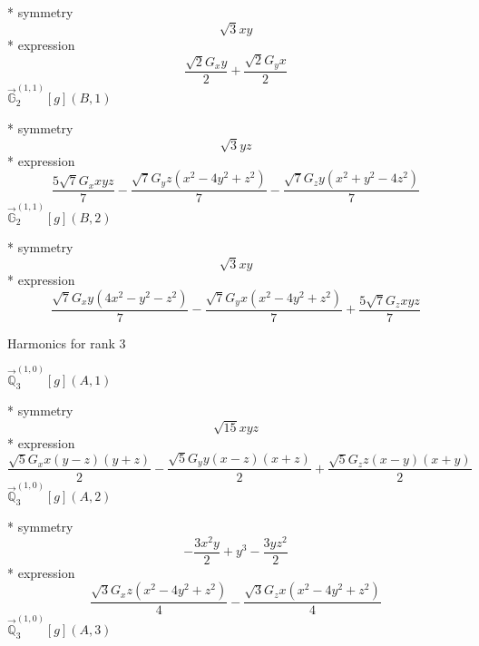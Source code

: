 \documentclass[fleqn,8pt]{jsarticle}
\begin{document}
\noindent\quad ** symmetry
\begin{dmath*}
\sqrt{3} x y
\end{dmath*}
\noindent\quad ** expression
\begin{dmath*}
\frac{\sqrt{2} G_{x} y}{2} + \frac{\sqrt{2} G_{y} x}{2}
\end{dmath*}
\noindent\quad $\vec{\mathbb{G}}_{2}^{(1,1)}[g](B,1)$

\noindent\quad ** symmetry
\begin{dmath*}
\sqrt{3} y z
\end{dmath*}
\noindent\quad ** expression
\begin{dmath*}
\frac{5 \sqrt{7} G_{x} x y z}{7} - \frac{\sqrt{7} G_{y} z \left(x^{2} - 4 y^{2} + z^{2}\right)}{7} - \frac{\sqrt{7} G_{z} y \left(x^{2} + y^{2} - 4 z^{2}\right)}{7}
\end{dmath*}
\noindent\quad $\vec{\mathbb{G}}_{2}^{(1,1)}[g](B,2)$

\noindent\quad ** symmetry
\begin{dmath*}
\sqrt{3} x y
\end{dmath*}
\noindent\quad ** expression
\begin{dmath*}
\frac{\sqrt{7} G_{x} y \left(4 x^{2} - y^{2} - z^{2}\right)}{7} - \frac{\sqrt{7} G_{y} x \left(x^{2} - 4 y^{2} + z^{2}\right)}{7} + \frac{5 \sqrt{7} G_{z} x y z}{7}
\end{dmath*}

\noindent * Harmonics for rank 3

\noindent\quad $\vec{\mathbb{Q}}_{3}^{(1,0)}[g](A,1)$

\noindent\quad ** symmetry
\begin{dmath*}
\sqrt{15} x y z
\end{dmath*}
\noindent\quad ** expression
\begin{dmath*}
\frac{\sqrt{5} G_{x} x \left(y - z\right) \left(y + z\right)}{2} - \frac{\sqrt{5} G_{y} y \left(x - z\right) \left(x + z\right)}{2} + \frac{\sqrt{5} G_{z} z \left(x - y\right) \left(x + y\right)}{2}
\end{dmath*}
\noindent\quad $\vec{\mathbb{Q}}_{3}^{(1,0)}[g](A,2)$

\noindent\quad ** symmetry
\begin{dmath*}
- \frac{3 x^{2} y}{2} + y^{3} - \frac{3 y z^{2}}{2}
\end{dmath*}
\noindent\quad ** expression
\begin{dmath*}
\frac{\sqrt{3} G_{x} z \left(x^{2} - 4 y^{2} + z^{2}\right)}{4} - \frac{\sqrt{3} G_{z} x \left(x^{2} - 4 y^{2} + z^{2}\right)}{4}
\end{dmath*}
\noindent\quad $\vec{\mathbb{Q}}_{3}^{(1,0)}[g](A,3)$
\end{document}
